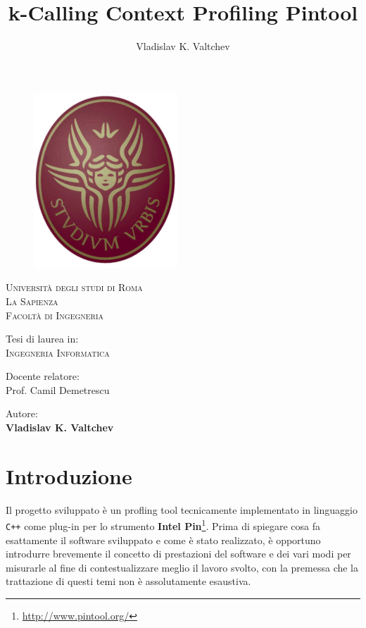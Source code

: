 \documentclass[a4paper,11pt]{report}
\author{Vladislav K. Valtchev}
\title{k-Calling Context Profiling Pintool}
\begin{document}
\thispagestyle{empty}

\begin{figure}
\centering
\includegraphics[scale=0.6]{logo}
\end{figure}


\begin{center}


{\Large\textsc{Università degli studi di Roma}\\} 
{\huge\textsc{La Sapienza}\\[10pt]}
{\huge\textsc{Facoltà di Ingegneria}\\[40pt]} 

{\large Tesi di laurea in: \\}
{\LARGE\textsc{Ingegneria Informatica}\\[50pt]}

{\large Docente relatore: \\}
{\large Prof. Camil Demetrescu\\[20pt]}

{\large Autore: \\}
{\large \textbf{Vladislav K. Valtchev}}

\end{center}


\tableofcontents

\chapter{Introduzione}

Il progetto sviluppato è un profling tool tecnicamente implementato in linguaggio \verb|C++| come plug-in per lo strumento 
\textbf{Intel Pin}\footnote{\url{http://www.pintool.org/}}.
Prima di spiegare cosa fa esattamente il software sviluppato e come è stato realizzato,
è opportuno introdurre brevemente il concetto di prestazioni del software e dei vari modi per misurarle 
al fine di contestualizzare meglio il lavoro svolto, con la premessa che la trattazione di questi temi non è assolutamente esaustiva.
\end{document}
